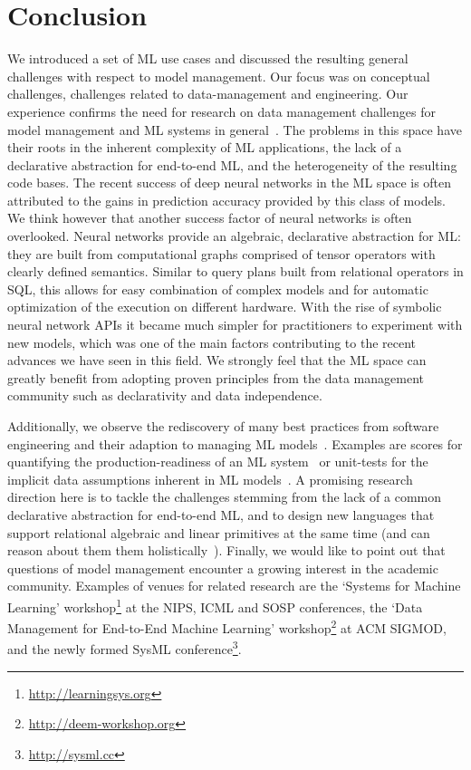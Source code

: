 \documentclass[11pt]{article}
\begin{document}
\section{Conclusion}

We introduced a set of ML use cases and discussed the resulting general challenges with respect to model management. Our focus was on conceptual challenges, challenges related to data-management and engineering. Our experience confirms the need for research on data management challenges for model management and ML systems in general~\cite{Sculley2015,Kumar2015}. The problems in this space have their roots in the inherent complexity of ML applications, the lack of a declarative abstraction for end-to-end ML, and the heterogeneity of the resulting code bases. The recent success of deep neural networks in the ML space is often attributed to the gains in prediction accuracy provided by this class of models. We think however that another success factor of neural networks is often overlooked. Neural networks provide an algebraic, declarative abstraction for ML: they are built from computational graphs comprised of tensor operators with clearly defined semantics. Similar to query plans built from relational operators in SQL, this allows for easy combination of complex models and for automatic optimization of the execution on different hardware. With the rise of symbolic neural network APIs it became much simpler for practitioners to experiment with new models, which was one of the main factors contributing to the recent advances we have seen in this field. We strongly feel that the ML space can greatly benefit from adopting proven principles from the data management community such as declarativity and data independence.

Additionally, we observe the rediscovery of many best practices from software engineering and their adaption to managing ML models~\cite{Zinkevich2017}. Examples are scores for quantifying the production-readiness of an ML system~\cite{Breck2016} or unit-tests for the implicit data assumptions inherent in ML models~\cite{Schelter2018}. A promising research direction here is to tackle the challenges stemming from the lack of a common declarative abstraction for end-to-end ML, and to design new languages that support relational algebraic and linear primitives at the same time (and can reason about them them holistically~\cite{Kunft2016,Kunft2017}). Finally, we would like to point out that questions of model management encounter a growing interest in the academic community. Examples of venues for related research are the `Systems for Machine Learning' workshop\footnote{\url{http://learningsys.org}} at the NIPS, ICML and SOSP conferences, the `Data Management for End-to-End Machine Learning' workshop\footnote{\url{http://deem-workshop.org}} at ACM SIGMOD, and the newly formed SysML conference\footnote{\url{http://sysml.cc}}.

\begin{small}
	
	
\end{small}
\end{document}

